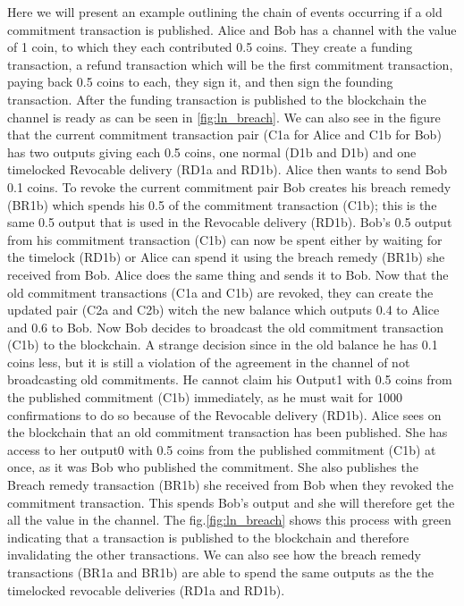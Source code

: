 Here we will present an example outlining the chain of events occurring if a old commitment transaction is published. Alice and Bob has a channel with the value of 1 coin, to which they each contributed 0.5 coins. They create a funding transaction, a refund transaction which will be the first commitment transaction, paying back 0.5 coins to each, they sign it, and then sign the founding transaction. After the funding transaction is published to the blockchain the channel is ready as can be seen in \cref{fig:ln_breach}. We can also see in the figure that the current commitment transaction pair (C1a for Alice and C1b for Bob) has two outputs giving each 0.5 coins, one normal (D1b and D1b) and one timelocked Revocable delivery (RD1a and RD1b). Alice then wants to send Bob 0.1 coins. To revoke the current commitment pair Bob creates his breach remedy (BR1b) which spends his 0.5 of the commitment transaction (C1b); this is the same 0.5 output that is used in the Revocable delivery (RD1b). Bob's 0.5 output from his commitment transaction (C1b) can now be spent either by waiting for the timelock (RD1b) or Alice can spend it using the breach remedy (BR1b) she received from Bob.
Alice does the same thing and sends it to Bob. Now that the old commitment transactions (C1a and C1b) are revoked, they can create the updated pair (C2a and C2b) witch the new balance which outputs 0.4 to Alice and 0.6 to Bob. Now Bob decides to broadcast the old commitment transaction (C1b) to the blockchain. A strange decision since in the old balance he has 0.1 coins less, but it is still a violation of the agreement in the channel of not broadcasting old commitments. 
He cannot claim his Output1 with 0.5 coins from the published commitment (C1b) immediately, as he must wait for 1000 confirmations to do so because of the Revocable delivery (RD1b).
Alice sees on the blockchain that an old commitment transaction has been published. She has access to her output0 with  0.5 coins from the published commitment (C1b) at once, as it was Bob who published the commitment. She also publishes the Breach remedy transaction (BR1b) she received from Bob when they revoked the commitment transaction. This spends Bob's output and she will therefore get the all the value in the channel. The fig.\ref{fig:ln_breach} shows this process with green indicating that a transaction is published to the blockchain and therefore invalidating the other transactions. We can also see how the breach remedy transactions (BR1a and BR1b) are able to spend the same outputs as the the timelocked revocable deliveries (RD1a and RD1b).


